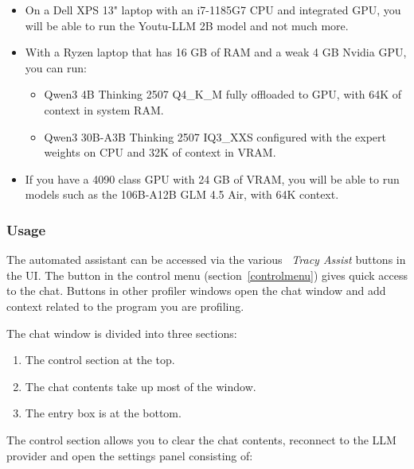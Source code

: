 \documentclass[hidelinks,titlepage,a4paper,twoside]{article}
\begin{document}
\begin{itemize}
\item On a Dell XPS 13" laptop with an i7-1185G7 CPU and integrated GPU, you will be able to run the Youtu-LLM 2B model and not much more.
\item With a Ryzen laptop that has 16 GB of RAM and a weak 4 GB Nvidia GPU, you can run:
\begin{itemize}
	\item Qwen3 4B Thinking 2507 Q4\_K\_M fully offloaded to GPU, with 64K of context in system RAM.
	\item Qwen3 30B-A3B Thinking 2507 IQ3\_XXS configured with the expert weights on CPU and 32K of context in VRAM.
\end{itemize}
\item If you have a 4090 class GPU with 24 GB of VRAM, you will be able to run models such as the 106B-A12B GLM 4.5 Air, with 64K context.
\end{itemize}

\subsubsection{Usage}
\label{llmusage}

The automated assistant can be accessed via the various \emph{\faRobot{}~Tracy Assist} buttons in the UI. The button in the control menu (section~\ref{controlmenu}) gives quick access to the chat. Buttons in other profiler windows open the chat window and add context related to the program you are profiling.

The chat window is divided into three sections:

\begin{enumerate}
\item The control section at the top.
\item The chat contents take up most of the window.
\item The entry box is at the bottom.
\end{enumerate}

The control section allows you to clear the chat contents, reconnect to the LLM provider and open the settings panel consisting of:
\end{document}
